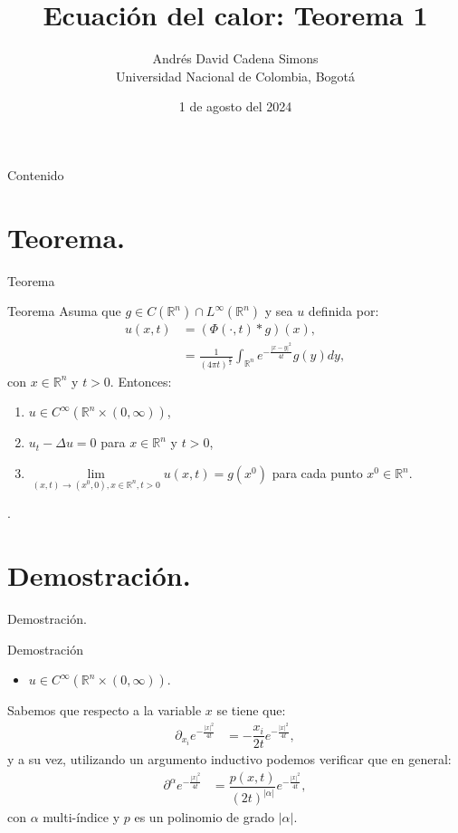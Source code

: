 \documentclass{beamer}
\title{Ecuación del calor: Teorema 1}
\author{\texorpdfstring{ 
Andrés David Cadena Simons \\
Universidad Nacional de Colombia, Bogotá}{A}}
\institute{ }
\date{\footnotesize 1 de agosto del 2024}
\begin{document}
\begin{frame}
  \titlepage

\end{frame}


\begin{frame}{Contenido}
  \tableofcontents
\end{frame}

\section{Teorema.}

\begin{frame}{Teorema}
  \begin{block}{Teorema}
    Asuma que $g\in C(\mathbb{R}^{n})\cap L^{\infty}(\mathbb{R}^{n})$ y sea $u$ definida por:
    \begin{align*}
      u(x,t)&=(\Phi(\cdot,t)*g)(x),\\
      &=\frac{1}{(4\pi t)^{\frac{n}{2}}}\int_{\mathbb{R}^{n}}e^{-\frac{|x-y|^2}{4t}}g(y)dy,
    \end{align*}
    con $x\in\mathbb{R}^{n}$ y $t>0$.
    Entonces:
    \begin{enumerate}
      \item $u\in C^{\infty}(\mathbb{R}^{n}\times (0,\infty))$,
      \item $u_t-\Delta u=0$ para $x\in\mathbb{R}^{n}$ y $t>0$,
      \item $\underset{(x,t)\rightarrow(x^0,0),x\in\mathbb{R}^{n},t>0}{\lim}u(x,t)=g(x^0)$ para cada punto $x^0\in\mathbb{R}^{n}$. 
    \end{enumerate}
    \cite{book:5979}.
  \end{block}
\end{frame}

\section{Demostración.}

\begin{frame}{Demostración.}
  \begin{block}{Demostración}
    \begin{itemize}
      \item $u\in C^{\infty}(\mathbb{R}^{n}\times (0,\infty))$.
    \end{itemize}
    Sabemos que respecto a la variable $x$ se tiene que:
    \begin{align*}
      \partial_{x_i}e^{-\frac{|x|^2}{4t}}&=-\dfrac{x_i}{2t}e^{-\frac{|x|^2}{4t}},
    \end{align*}
    y a su vez, utilizando un argumento inductivo podemos verificar que en general:
    \begin{align*}
      \partial^{\alpha}e^{-\frac{|x|^2}{4t}}&=\dfrac{p(x,t)}{(2t)^{|\alpha|}}e^{-\frac{|x|^2}{4t}},
    \end{align*}
    con $\alpha$ multi-índice y $p$ es un polinomio de grado $|\alpha|$. 
  \end{block}
\end{frame}
\end{document}
